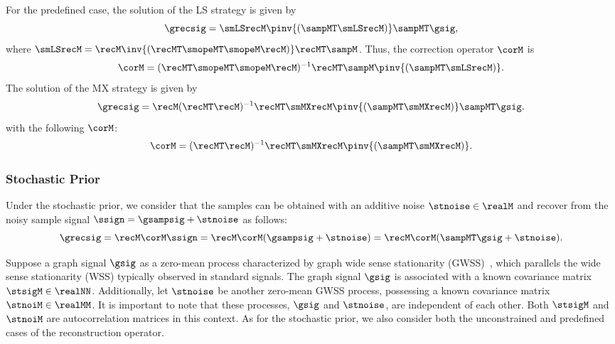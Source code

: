 \documentclass[journal]{IEEEtran}
\begin{document}
For the predefined case, the solution of the LS strategy is given by
\begin{equation}\label{sm_pre_sol_LS}
\grecsig = \smLSrecM \pinv{(\sampMT \smLSrecM)} \sampMT \gsig,
\end{equation}
where $\smLSrecM = \recM \inv{(\recMT \smopeMT \smopeM \recM)} \recMT \sampM$.
Thus, the correction operator $\corM$ is
\begin{equation} \label{sm_pre_LS_corM}
   \corM = (\recMT \smopeMT \smopeM \recM)^{-1} \recMT \sampM \pinv{(\sampMT \smLSrecM)}.
\end{equation}
The solution of the MX strategy is given by
\begin{equation}\label{sm_pre_sol_MX}
    \grecsig = \recM (\recMT\recM)^{-1}\recMT \smMXrecM \pinv{(\sampMT \smMXrecM)} \sampMT \gsig.
\end{equation}
with the following $\corM$:
\begin{equation} \label{sm_pre_MX_corM}
   \corM = (\recMT \recM)^{-1} \recMT \smMXrecM \pinv{(\sampMT \smMXrecM)}.
\end{equation}

\subsubsection{Stochastic Prior} \label{subsec:pre_st_priors}
Under the stochastic prior, we consider that the samples can be obtained with an additive noise $\stnoise \in \realM$ and recover from the noisy sample signal $\ssign = \gsampsig + \stnoise$ as follows: 
\begin{equation} \label{st-reconstruction}
    \grecsig = \recM \corM \ssign = \recM \corM (\gsampsig + \stnoise) = \recM \corM (\sampMT \gsig + \stnoise).
\end{equation}

Suppose a graph signal $\gsig$ as a zero-mean process characterized by graph wide sense stationarity (GWSS)~\cite{hara2023graph}, which parallels the wide sense stationarity (WSS) typically observed in standard signals. 
The graph signal $\gsig$ is associated with a known covariance matrix $\stsigM \in \realNN$. 
Additionally, let $\stnoise$ be another zero-mean GWSS process, possessing a known covariance matrix $\stnoiM \in \realMM$. 
It is important to note that these processes, $\gsig$ and $\stnoise$, are independent of each other. 
Both $\stsigM$ and $\stnoiM$ are autocorrelation matrices in this context.
As for the stochastic prior, we also consider both the unconstrained and predefined cases of the reconstruction operator.
\end{document}

